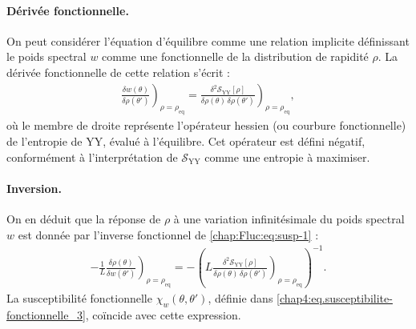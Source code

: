 %
%
%


\medskip
\paragraph{Dérivée fonctionnelle.}
On peut considérer l’équation d’équilibre comme une relation implicite définissant le poids spectral $w$ comme une fonctionnelle de la distribution de rapidité $\rho$. La dérivée fonctionnelle de cette relation s’écrit :
\begin{eqnarray}
	\left. \frac{\delta w(\theta)}{\delta \rho(\theta')} \right)_{\rho = \rho_{\mathrm{eq}}} = \left. \frac{\delta^2 \mathcal{S}_{\mathrm{YY}}[\rho]}{\delta \rho(\theta)\, \delta \rho(\theta')} \right)_{\rho = \rho_{\mathrm{eq}}}, \label{chap:Fluc:eq:susp-1}
\end{eqnarray}
où le membre de droite représente l’opérateur hessien (ou courbure fonctionnelle) de l'entropie de \gls{YY}, évalué à l’équilibre. Cet opérateur est défini négatif, conformément à l’interprétation de $\mathcal{S}_{\mathrm{YY}}$ comme une entropie à maximiser.

\paragraph{Inversion.}
On en déduit que la réponse de $\rho$ à une variation infinitésimale du poids spectral $w$ est donnée par l'inverse fonctionnel de \eqref{chap:Fluc:eq:susp-1} :
\begin{eqnarray}
	-\frac{1}{L} \left. \frac{\delta \rho(\theta)}{\delta w(\theta')} \right)_{\rho = \rho_{\mathrm{eq}}} = - \left( L \left. \frac{\delta^2 \mathcal{S}_{\mathrm{YY}}[\rho]}{\delta \rho(\theta)\, \delta \rho(\theta')} \right)_{\rho = \rho_{\mathrm{eq}}} \right)^{-1}. \label{chap:Fluc:eq:susp-2}
\end{eqnarray}
La susceptibilité fonctionnelle $\chi_w(\theta, \theta')$, définie dans \eqref{chap4:eq.susceptibilite-fonctionnelle_3}, coïncide avec cette expression.


